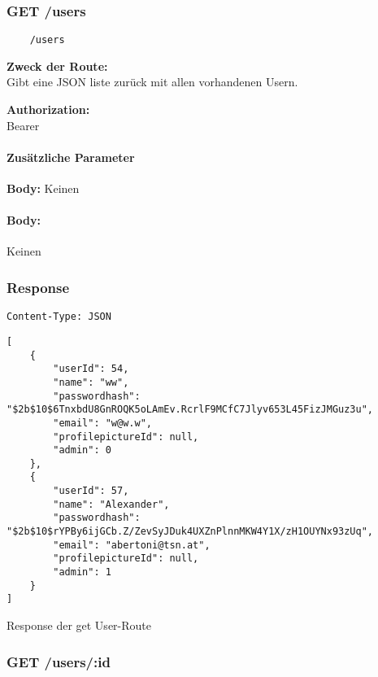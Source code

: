 \label{/users}

\subsubsection{GET /users}

\begin{lstlisting}
    /users
\end{lstlisting}

\textbf{Zweck der Route:} \\
Gibt  eine JSON liste zurück mit allen vorhandenen Usern.

\textbf{Authorization:} \\
Bearer

\paragraph{Zusätzliche Parameter}

\textbf{Body:}
Keinen

\paragraph{Body:}

Keinen

\subsubsection{Response}

\begin{code}[h]
    \lstinline{Content-Type: JSON}
    \begin{lstlisting}
[
    {
        "userId": 54,
        "name": "ww",
        "passwordhash": "$2b$10$6TnxbdU8GnROQK5oLAmEv.RcrlF9MCfC7Jlyv653L45FizJMGuz3u",
        "email": "w@w.w",
        "profilepictureId": null,
        "admin": 0
    },
    {
        "userId": 57,
        "name": "Alexander",
        "passwordhash": "$2b$10$rYPBy6ijGCb.Z/ZevSyJDuk4UXZnPlnnMKW4Y1X/zH1OUYNx93zUq",
        "email": "abertoni@tsn.at",
        "profilepictureId": null,
        "admin": 1
    }
]
\end{lstlisting}
    \caption{Response der get User-Route}
\end{code}



\pagebreak

\subsubsection{GET /users/:id}

